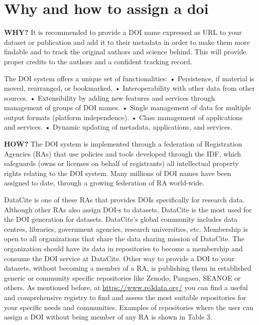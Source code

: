 \documentclass[
]{book}
\begin{document}
\hypertarget{why-and-how-to-assign-a-doi}{%
\chapter{Why and how to assign a doi}\label{why-and-how-to-assign-a-doi}}

\textbf{WHY?}
It is recommended to provide a DOI name expressed as URL to your dataset or publication and add it to their metadata in order to make them more findable and to track the original authors and science behind. This will provide proper credits to the authors and a confident tracking record.

The DOI system offers a unique set of functionalities:
• Persistence, if material is moved, rearranged, or bookmarked.
• Interoperability with other data from other sources.
• Extensibility by adding new features and services through management of groups of DOI names.
• Single management of data for multiple output formats (platform independence).
• Class management of applications and services.
• Dynamic updating of metadata, applications, and services.

\textbf{HOW?}
The DOI system is implemented through a federation of Registration Agencies (RAs) that use policies and tools developed through the IDF, which safeguards (owns or licenses on behalf of registrants) all intellectual property rights relating to the DOI system. Many millions of DOI names have been assigned to date, through a growing federation of RA world-wide.

DataCite is one of these RAs that provides DOIs specifically for research data. Although other RAs also assign DOI-s to datasets, DataCite is the most used for the DOI generation for datasets. DataCite's global community includes data centres, libraries, government agencies, research universities, etc. Membership is open to all organizations that share the data sharing mission of DataCite. The organization should have its data in repositories to become a membership and consume the DOI service at DataCite. Other way to provide a DOI to your datasets, without becoming a member of a RA, is publishing them in established generic or community specific repositories like Zenodo, Pangaea, SEANOE or others. As mentioned before, at \url{https://www.re3data.org/} you can find a useful and comprehensive registry to find and assess the most suitable repositories for your specific needs and communities. Examples of repositories where the user can assign a DOI without being member of any RA is shown in Table 3.
\end{document}
